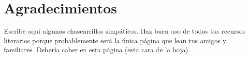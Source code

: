 
\chapter{Agradecimientos}

Escribe aquí algunos chascarrillos simpáticos. Haz buen uso de todos tus
recursos literarios porque probablemente será la única página que lean tus
amigos y familiares. Debería caber en esta página (esta cara de la hoja).



